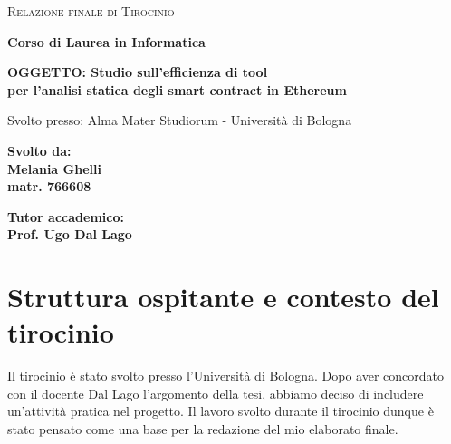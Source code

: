 \documentclass[a4paper,10pt]{article}
\title{}
\author{}
\begin{document}
\begin{titlepage}

\begin{center}
{\Large{\textsc{Relazione finale di Tirocinio}}}

\vspace{3mm}
{\small{\bf Corso di Laurea in Informatica }}
\end{center}

\vspace{50mm}

\begin{center}
{\Large{\bf OGGETTO: Studio sull'efficienza di tool}}\\
\vspace{2mm}
{\Large{\bf per l'analisi statica degli smart contract in Ethereum}}
\end{center}

\vspace{3mm}

\begin{center}
{\large{Svolto presso: Alma Mater Studiorum - Università di Bologna}}
\end{center}

\vspace{70mm}

\par
\noindent
\begin{minipage}[t]{0.47\textwidth}
{\large{\bf Svolto da:\\
Melania Ghelli\\
matr. 766608}}
\end{minipage}
\hfill
\begin{minipage}[t]{0.47\textwidth}\raggedleft
{\large{\bf Tutor accademico:\\
Prof. Ugo Dal Lago}}
\end{minipage}

\end{titlepage}

\section{Struttura ospitante e contesto del tirocinio}
Il tirocinio è stato svolto presso l'Università di Bologna.\newline 
Dopo aver concordato con il docente Dal Lago l'argomento della tesi, abbiamo deciso di includere un'attività pratica nel progetto. Il lavoro svolto durante il tirocinio dunque è stato pensato come una base per la redazione del mio elaborato finale.
\end{document}
